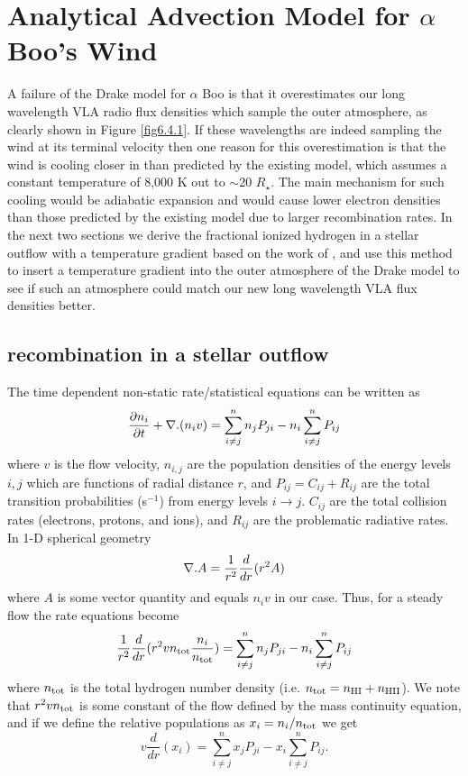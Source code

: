 \section{Analytical Advection Model for $\alpha$ Boo's Wind}
\label{sec:6.7}
A failure of the Drake model for $\alpha$ Boo is that it overestimates our long wavelength VLA radio flux densities which sample the outer atmosphere, as clearly shown in Figure \ref{fig6.4.1}. If these wavelengths are indeed sampling the wind at its terminal velocity then one reason for this overestimation is that the wind is cooling closer in than predicted by the existing model, which assumes a constant temperature of 8,000 K out to $\sim$20 $R_{\star}$. The main mechanism for such cooling would be adiabatic expansion \citep{ogorman_2011} and would cause lower electron densities than those predicted by the existing model due to larger recombination rates. In the next two sections we derive the fractional ionized hydrogen in a stellar outflow with a temperature gradient based on the work of \cite{glassgold_1986}, and use this method to insert a temperature gradient into the outer atmosphere of the Drake model to see if such an atmosphere could match our new long wavelength VLA flux densities better.

\subsection{ recombination in a stellar outflow}\label{sec:6.6.1}

The time dependent non-static rate/statistical equations can be written as
\begin{equation}
\frac{\partial n_{i}}{\partial t}+{\bf \nabla }{.(n_{i}v)} = \sum_{i\neq j}^n n_{j}P_{ji} - n_{i}\sum_{i\neq j}^n P_{ij} 
\end{equation}
where $v$ is the flow velocity, $n_{i,j}$ are the population densities of the energy levels $i,j$ which are functions of radial distance $r$, and  $P_{ij}=C_{ij}+R_{ij}$ are the total transition probabilities (s$^{-1}$) from energy levels $i \rightarrow j$. $C_{ij}$ are the total collision rates (electrons, protons, and ions), and $R_{ij}$ are the problematic radiative rates. In 1-D spherical geometry
\begin{equation}
{\bf \nabla }{.A} = \frac{1}{r^2}\frac{d}{dr}(r^2 A)
\end{equation}
where $A$ is some vector quantity and equals $n_{i}v$ in our case. Thus, for a steady flow the rate equations become
\begin{equation}
\frac{1}{r^2}\frac{d}{dr}(r^2 vn_{\rm{tot}}\frac{n_{i}}{n_{\rm{tot}}}) = \sum_{i\neq j}^{n} n_{j}P_{ji} - n_{i}\sum_{i\neq j}^n P_{ij}
\end{equation}
where $n_{\rm{tot}}$ is the total hydrogen number density (i.e. $n_{\rm{tot}} = n_{\rm{HI}}+n_{\rm{HII}}$).
We note that $r^2 vn_{\rm{tot}}$ is some constant of the flow defined by the mass continuity equation, and if we define the relative populations as $x_{i}=n_{i}/n_{\rm{tot}}$ we get
\begin{equation}
v\frac{d}{dr}(x_{i}) = \sum_{i\neq j}^{n} x_{j}P_{ji} - x_{i}\sum_{i\neq j}^n P_{ij}.
\label{eq:eq6.9.1}
\end{equation}

